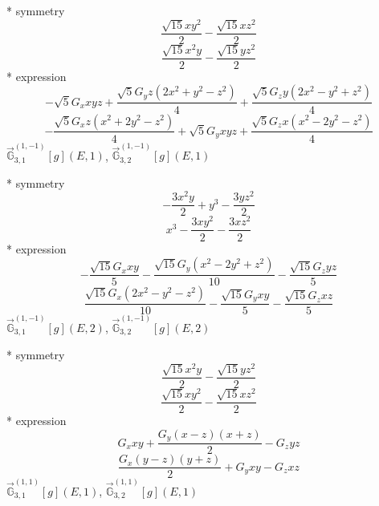\documentclass[fleqn,8pt]{jsarticle}
\begin{document}
\noindent\quad ** symmetry
\begin{dmath*}
\frac{\sqrt{15} x y^{2}}{2} - \frac{\sqrt{15} x z^{2}}{2}
\end{dmath*}
\begin{dmath*}
\frac{\sqrt{15} x^{2} y}{2} - \frac{\sqrt{15} y z^{2}}{2}
\end{dmath*}
\noindent\quad ** expression
\begin{dmath*}
- \sqrt{5} G_{x} x y z + \frac{\sqrt{5} G_{y} z \left(2 x^{2} + y^{2} - z^{2}\right)}{4} + \frac{\sqrt{5} G_{z} y \left(2 x^{2} - y^{2} + z^{2}\right)}{4}
\end{dmath*}
\begin{dmath*}
- \frac{\sqrt{5} G_{x} z \left(x^{2} + 2 y^{2} - z^{2}\right)}{4} + \sqrt{5} G_{y} x y z + \frac{\sqrt{5} G_{z} x \left(x^{2} - 2 y^{2} - z^{2}\right)}{4}
\end{dmath*}
\noindent\quad $\vec{\mathbb{G}}_{3,1}^{(1,-1)}[g](E,1)$, $\vec{\mathbb{G}}_{3,2}^{(1,-1)}[g](E,1)$

\noindent\quad ** symmetry
\begin{dmath*}
- \frac{3 x^{2} y}{2} + y^{3} - \frac{3 y z^{2}}{2}
\end{dmath*}
\begin{dmath*}
x^{3} - \frac{3 x y^{2}}{2} - \frac{3 x z^{2}}{2}
\end{dmath*}
\noindent\quad ** expression
\begin{dmath*}
- \frac{\sqrt{15} G_{x} x y}{5} - \frac{\sqrt{15} G_{y} \left(x^{2} - 2 y^{2} + z^{2}\right)}{10} - \frac{\sqrt{15} G_{z} y z}{5}
\end{dmath*}
\begin{dmath*}
\frac{\sqrt{15} G_{x} \left(2 x^{2} - y^{2} - z^{2}\right)}{10} - \frac{\sqrt{15} G_{y} x y}{5} - \frac{\sqrt{15} G_{z} x z}{5}
\end{dmath*}
\noindent\quad $\vec{\mathbb{G}}_{3,1}^{(1,-1)}[g](E,2)$, $\vec{\mathbb{G}}_{3,2}^{(1,-1)}[g](E,2)$

\noindent\quad ** symmetry
\begin{dmath*}
\frac{\sqrt{15} x^{2} y}{2} - \frac{\sqrt{15} y z^{2}}{2}
\end{dmath*}
\begin{dmath*}
\frac{\sqrt{15} x y^{2}}{2} - \frac{\sqrt{15} x z^{2}}{2}
\end{dmath*}
\noindent\quad ** expression
\begin{dmath*}
G_{x} x y + \frac{G_{y} \left(x - z\right) \left(x + z\right)}{2} - G_{z} y z
\end{dmath*}
\begin{dmath*}
\frac{G_{x} \left(y - z\right) \left(y + z\right)}{2} + G_{y} x y - G_{z} x z
\end{dmath*}
\noindent\quad $\vec{\mathbb{G}}_{3,1}^{(1,1)}[g](E,1)$, $\vec{\mathbb{G}}_{3,2}^{(1,1)}[g](E,1)$
\end{document}
